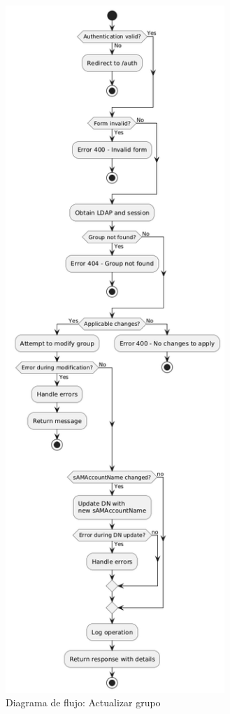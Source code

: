 \begin{figure}[h]
    \centering
    \includegraphics[height=26cm]{images/puml/flow-diagram-update group/flow-diagram update group.png}
    \caption{Diagrama de flujo: Actualizar grupo}
    \label{fig:flow-diagram-update-group}
\end{figure}
\restoregeometry